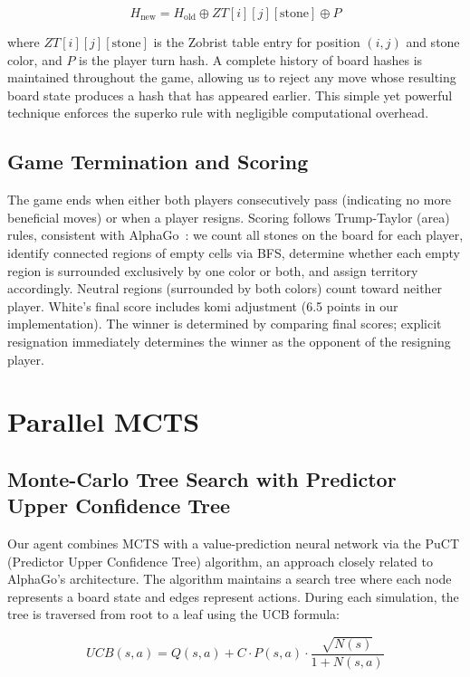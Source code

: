 \documentclass[12pt]{article}
\begin{document}
\begin{equation}
H_{\text{new}} = H_{\text{old}} \oplus ZT[i][j][\text{stone}] \oplus P
\end{equation}

where $ZT[i][j][\text{stone}]$ is the Zobrist table entry for position $(i,j)$ and stone color, and $P$ is the player turn hash. A complete history of board hashes is maintained throughout the game, allowing us to reject any move whose resulting board state produces a hash that has appeared earlier. This simple yet powerful technique enforces the superko rule with negligible computational overhead.

\subsection{Game Termination and Scoring}

The game ends when either both players consecutively pass (indicating no more beneficial moves) or when a player resigns. Scoring follows Trump-Taylor (area) rules, consistent with AlphaGo~\cite{silver2016}: we count all stones on the board for each player, identify connected regions of empty cells via BFS, determine whether each empty region is surrounded exclusively by one color or both, and assign territory accordingly. Neutral regions (surrounded by both colors) count toward neither player. White's final score includes komi adjustment (6.5 points in our implementation). The winner is determined by comparing final scores; explicit resignation immediately determines the winner as the opponent of the resigning player.

\section{Parallel MCTS}

\subsection{Monte-Carlo Tree Search with Predictor Upper Confidence Tree}

Our agent combines MCTS with a value-prediction neural network via the PuCT (Predictor Upper Confidence Tree) algorithm, an approach closely related to AlphaGo's architecture. The algorithm maintains a search tree where each node represents a board state and edges represent actions. During each simulation, the tree is traversed from root to a leaf using the UCB formula:

\begin{equation}
UCB(s, a) = Q(s, a) + C \cdot P(s, a) \cdot \frac{\sqrt{N(s)}}{1 + N(s, a)}
\end{equation}
\end{document}
